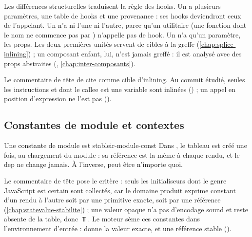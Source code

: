 
Les différences structurelles traduisent la règle des hooks. Un  a plusieurs paramètres, une table de hooks et une provenance : ses hooks deviendront ceux de l'appelant. Un  n'a ni l'une ni l'autre, parce qu'un utilitaire (une fonction dont le nom ne commence pas par ) n'appelle pas de hook. Un  n'a qu'un paramètre, les props. Les deux premières unités servent de cibles à la greffe (\cref{chap:splice-inlining}) ; un composant enfant, lui, n'est jamais greffé : il est analysé avec des props abstraites (, \cref{chap:inter-composants}).

\begin{piege}
Le commentaire de tête de  cite  comme cible d'inlining. Au commit étudié, seules les instructions  et  dont le callee est une variable sont inlinées () ; un appel en position d'expression ne l'est pas ().
\end{piege}

\subsection{Constantes de module et contextes}

\begin{exemple}{Une constante de module est stable}{ir-module-const}
Dans , le tableau est créé une fois, au chargement du module : sa référence est la même à chaque rendu, et le dep ne change jamais. À l'inverse,  peut être n'importe quoi.
\end{exemple}


Le commentaire de tête pose le critère : seuls les initialiseurs dont le genre JavaScript est certain sont collectés, car le domaine produit exprime \og constant d'un rendu à l'autre\fg{} soit par une primitive exacte, soit par une référence  (\cref{chap:statevalue-stabilite}) ; une valeur opaque n'a pas d'encodage sound et reste absente de la table, donc $\Top$. Le moteur sème ces constantes dans l'environnement d'entrée :  donne la valeur exacte,  et  une référence stable ().

